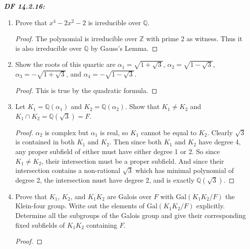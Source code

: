 \documentclass{article}
\begin{document}
\it \textbf{DF 14.2.16:}
  \begin{enumerate}[label={(\alph*)}]
    \item Prove that $x^4-2x^2-2$ is irreducible over $\mathbb{Q}$.
      \begin{proof}
        The polynomial is irreducible over $\mathbb{Z}$ with prime 2 as
        witness. Thus it is also irreducible over $\mathbb{Q}$ by Gauss's
        Lemma.
      \end{proof}

    \item Show the roots of this quartic are $\alpha_1=\sqrt{1+\sqrt{3}}$,
      $\alpha_2=\sqrt{1-\sqrt{3}}$, $\alpha_3=-\sqrt{1+\sqrt{3}}$, and
      $\alpha_4=-\sqrt{1-\sqrt{3}}$.

      \begin{proof}
        This is true by the quadratic formula.
      \end{proof}

    \item Let $K_1=\mathbb{Q}(\alpha_1)$ and $K_2=\mathbb{Q}(\alpha_2)$.
      Show that $K_1\neq K_2$ and $K_1\cap K_2=\mathbb{Q}(\sqrt{3})=F$.

      \begin{proof}
        $\alpha_2$ is complex but $\alpha_1$ is real, so $K_1$ cannot be
        equal to $K_2$. Clearly $\sqrt{3}$ is contained in both $K_1$ and
        $K_2$. Then since both $K_1$ and $K_2$ have degree 4, any proper
        subfield of either must have either degree 1 or 2. So since
        $K_1\neq K_2$, their intersection must be a proper subfield. And
        since their intersection contains a non-rational $\sqrt{3}$ which
        has minimal polynomial of degree 2, the intersection
        must have degree 2, and is exactly $\mathbb{Q}(\sqrt{3})$.
      \end{proof}

    \item Prove that $K_1$, $K_2$, and $K_1K_2$ are Galois over $F$ with
      $\text{Gal}(K_1K_2/F)$ the Klein-four group. Write out the elements
      of $\text{Gal}(K_1K_2/F)$ explicitly. Determine all the subgroups of
      the Galois group and give their corresponding fixed subfields of
      $K_1K_2$ containing $F$.

      \begin{proof}
      \end{proof}
  \end{enumerate}
\end{document}
